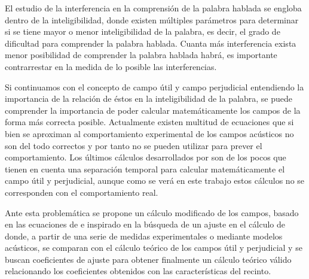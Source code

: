 El estudio de la interferencia en la comprensión de la palabra hablada se engloba dentro de la inteligibilidad, donde existen múltiples parámetros para determinar si se tiene mayor o menor inteligibilidad de la palabra, es decir, el grado de dificultad para comprender la palabra hablada. Cuanta más interferencia exista menor posibilidad de comprender la palabra hablada habrá, es importante contrarrestar en la medida de lo posible las interferencias.

Si continuamos con el concepto de campo útil y campo perjudicial entendiendo la importancia de la relación de éstos en la inteligibilidad de la palabra, se puede comprender la importancia de poder calcular matemáticamente los campos de la forma más correcta posible. Actualmente existen multitud de ecuaciones que si bien se aproximan al comportamiento experimental de los campos acústicos no son del todo correctos y por tanto no se pueden utilizar para prever el comportamiento. Los últimos cálculos desarrollados por \cite{Barron1988} son de los pocos que tienen en cuenta una separación temporal para calcular matemáticamente el campo útil y perjudicial, aunque como se verá en este trabajo estos cálculos no se corresponden con el comportamiento real.

Ante esta problemática se propone un cálculo modificado de los campos, basado en las ecuaciones de \citeauthor{Barron1988} e inspirado en la búsqueda de un ajuste en el cálculo de \cite{Sato2008} donde, a partir de una serie de medidas experimentales o mediante modelos acústicos, se comparan con el cálculo teórico de los campos útil y perjudicial y se buscan coeficientes de ajuste para obtener finalmente un cálculo teórico válido relacionando los coeficientes obtenidos con las características del recinto.

























